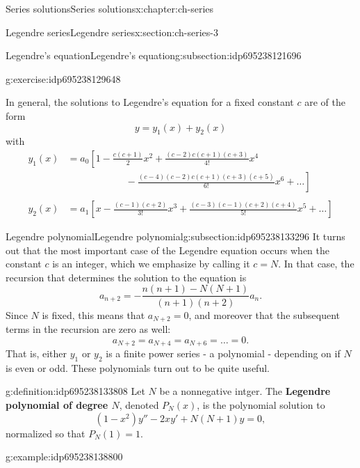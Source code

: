 \documentclass[oneside,10pt,]{book}
\newcommand{\terminology}[1]{\textbf{#1}}
\numberwithin{equation}{section}
\numberwithin{equation}{section}
\newcommand{\amp}{&}
\begin{document}
\begin{chapterptx}{Series solutions}{}{Series solutions}{}{}{x:chapter:ch-series}
\begin{sectionptx}{Legendre series}{}{Legendre series}{}{}{x:section:ch-series-3}
\begin{subsectionptx}{Legendre's equation}{}{Legendre's equation}{}{}{g:subsection:idp695238121696}
\begin{inlineexercise}{}{g:exercise:idp695238129648}
\end{inlineexercise}%
In general, the solutions to Legendre's equation for a fixed constant \(c\) are of the form%
\begin{equation*}
y = y_1(x) + y_2(x)
\end{equation*}
with%
\begin{align*}
y_1(x) \amp= a_0\left[1 - \frac{c(c+1)}{2}x^2 + \frac{(c-2)c(c+1)(c+3)}{4!} x^4\right. \\
\amp\left.\hspace{1in} - \frac{(c-4)(c-2)c(c+1)(c+3)(c+5)}{6!} x^6 +\ldots\right]\\
\\
y_2(x) \amp= a_1\left[x - \frac{(c-1)(c+2)}{3!} x^3 + \frac{(c-3)(c-1)(c+2)(c+4)}{5!}x^5 + \ldots\right]
\end{align*}
%
\end{subsectionptx}
%
%
\typeout{************************************************}
\typeout{************************************************}
%
\begin{subsectionptx}{Legendre polynomial}{}{Legendre polynomial}{}{}{g:subsection:idp695238133296}
It turns out that the most important case of the Legendre equation occurs when the constant \(c\) is an integer, which we emphasize by calling it \(c=N\). In that case, the recursion that determines the solution to the equation is%
\begin{equation*}
a_{n+2} = -\frac{n(n+1) - N(N+1)}{(n+1)(n+2)} a_n.
\end{equation*}
Since \(N\) is fixed, this means that \(a_{N+2} = 0\), and moreover that the subsequent terms in the recursion are zero as well:%
\begin{equation*}
a_{N+2} = a_{N+4} = a_{N+6} = \ldots = 0.
\end{equation*}
That is, either \(y_1\) or \(y_2\) is a finite power series - a polynomial - depending on if \(N\) is even or odd. These polynomials turn out to be quite useful.%
\begin{definition}{}{g:definition:idp695238133808}%
Let \(N\) be a nonnegative intger. The \terminology{Legendre polynomial of degree \(N\)}, denoted \(P_N(x)\), is the polynomial solution to%
\begin{equation*}
(1- x^2) y'' - 2 x y' + N(N+1)y = 0,
\end{equation*}
normalized so that \(P_N(1) = 1\).%
\end{definition}
\begin{example}{}{g:example:idp695238138800}%

\end{example}
\end{subsectionptx}
\end{sectionptx}
\end{chapterptx}
\end{document}
